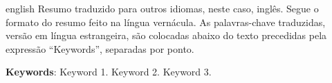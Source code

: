 \begin{resumo}[Abstract]
	\SingleSpacing
	\begin{otherlanguage*}{english}
		Resumo traduzido para outros idiomas, neste caso, inglês. Segue o formato do resumo feito na língua vernácula. As palavras-chave traduzidas, versão em língua estrangeira, são colocadas abaixo do texto precedidas pela expressão “Keywords”, separadas por ponto.
		
		\textbf{Keywords}: Keyword 1. Keyword 2. Keyword 3.
	\end{otherlanguage*}
\end{resumo}

% 
%
%  

{%
	\hypersetup{hidelinks}
	\listoffigures*
	\cleardoublepage
	
	\listofquadros*
	\cleardoublepage
	
	\listoftables*
	\cleardoublepage
	
	\imprimirlistadesiglas
	
	\imprimirlistadesimbolos
	
	\tableofcontents*
	\cleardoublepage
	
}%
